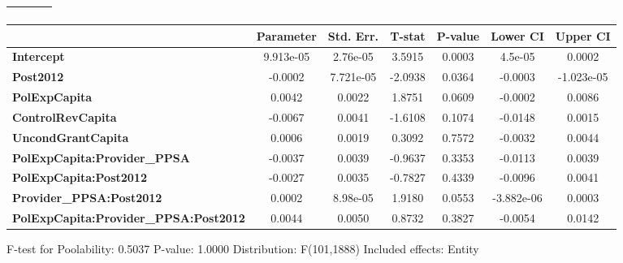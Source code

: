 \begin{center}
\begin{tabular}{lclc}
\textbf{}                                     &                    & \textbf{                     }   &                  \\
\bottomrule
\end{tabular}
\begin{tabular}{lcccccc}
                                              & \textbf{Parameter} & \textbf{Std. Err.} & \textbf{T-stat} & \textbf{P-value} & \textbf{Lower CI} & \textbf{Upper CI}  \\
\midrule
\textbf{Intercept}                            &     9.913e-05      &      2.76e-05      &      3.5915     &      0.0003      &       4.5e-05     &       0.0002       \\
\textbf{Post2012}                             &      -0.0002       &     7.721e-05      &     -2.0938     &      0.0364      &      -0.0003      &     -1.023e-05     \\
\textbf{PolExpCapita}                         &       0.0042       &       0.0022       &      1.8751     &      0.0609      &      -0.0002      &       0.0086       \\
\textbf{ControlRevCapita}                     &      -0.0067       &       0.0041       &     -1.6108     &      0.1074      &      -0.0148      &       0.0015       \\
\textbf{UncondGrantCapita}                    &       0.0006       &       0.0019       &      0.3092     &      0.7572      &      -0.0032      &       0.0044       \\
\textbf{PolExpCapita:Provider\_PPSA}          &      -0.0037       &       0.0039       &     -0.9637     &      0.3353      &      -0.0113      &       0.0039       \\
\textbf{PolExpCapita:Post2012}                &      -0.0027       &       0.0035       &     -0.7827     &      0.4339      &      -0.0096      &       0.0041       \\
\textbf{Provider\_PPSA:Post2012}              &       0.0002       &      8.98e-05      &      1.9180     &      0.0553      &     -3.882e-06    &       0.0003       \\
\textbf{PolExpCapita:Provider\_PPSA:Post2012} &       0.0044       &       0.0050       &      0.8732     &      0.3827      &      -0.0054      &       0.0142       \\
\bottomrule
\end{tabular}
\end{center}

F-test for Poolability: 0.5037 \newline
 P-value: 1.0000 \newline
 Distribution: F(101,1888) \newline
  \newline
 Included effects: Entity